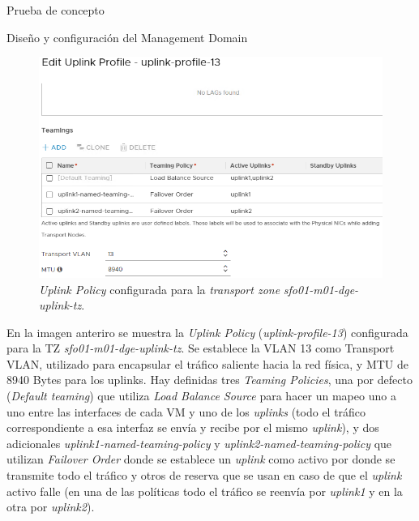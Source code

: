 \begin{section}{Prueba de concepto}
\begin{subsection}{Diseño y configuración del Management Domain}
\begin{figure}[h]
      \includegraphics[width=1\textwidth]{imaxes/pruebaconcepto/UplinkPolicy13.png}
      \caption{\textit{Uplink Policy} configurada para la \textit{transport zone} \textit{sfo01-m01-dge-uplink-tz}.}
      \label{fig:Uplink-Policy-13-NSXT} 
    \end{figure}
    \FloatBarrier
    En la imagen anteriro se muestra la \textit{Uplink Policy} (\textit{uplink-profile-13}) configurada para la TZ \textit{sfo01-m01-dge-uplink-tz}. Se establece la VLAN 13 como Transport VLAN, utilizado para encapsular el tráfico saliente hacia la red física, y MTU de 8940 Bytes para los uplinks. Hay definidas tres \textit{Teaming Policies}, una por defecto (\textit{Default teaming}) que utiliza \textit{Load Balance Source} para hacer un mapeo uno a uno entre las interfaces de cada VM y uno de los \textit{uplinks} (todo el tráfico correspondiente a esa interfaz se envía y recibe por el mismo \textit{uplink}), y dos adicionales \textit{uplink1-named-teaming-policy} y \textit{uplink2-named-teaming-policy} que utilizan \textit{Failover Order} donde se establece un \textit{uplink} como activo por donde se transmite todo el tráfico y otros de reserva que se usan en caso de que el \textit{uplink} activo falle (en una de las políticas todo el tráfico se reenvía por \textit{uplink1} y en la otra por \textit{uplink2}).


\end{subsection}
\end{section}
